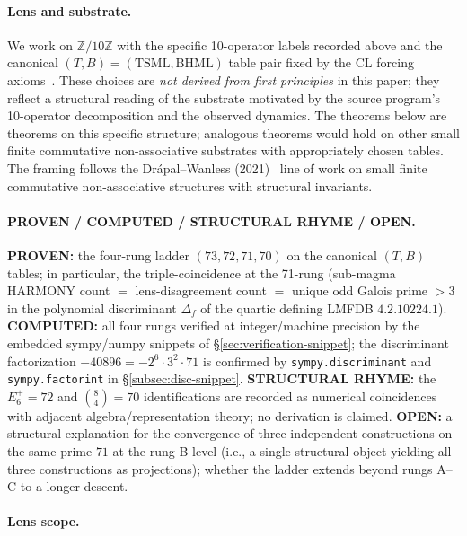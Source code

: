 \documentclass[11pt,reqno]{amsart}
\theoremstyle{definition}
\newcommand{\Z}{\mathbb{Z}}
\newcommand{\TSML}{\mathrm{TSML}}
\newcommand{\BHML}{\mathrm{BHML}}
\begin{document}
\paragraph{Lens and substrate.}
\label{sec:lens-subs}

We work on $\Z/10\Z$ with the specific 10-operator labels recorded
above and the canonical $(T, B) = (\TSML, \BHML)$ table pair fixed by
the CL forcing axioms~\cite{Sanders2026CLAxioms}. These choices are
\emph{not derived from first principles} in this paper; they reflect a
structural reading of the substrate motivated by the source program's
10-operator decomposition and the observed dynamics. The theorems
below are theorems on this specific structure; analogous theorems
would hold on other small finite commutative non-associative
substrates with appropriately chosen tables. The framing follows the
Drápal--Wanless (2021)~\cite{DrapalWanless2021a,DrapalWanless2021b} line of work on small
finite commutative non-associative structures with structural
invariants.

\paragraph{PROVEN / COMPUTED / STRUCTURAL RHYME / OPEN.}

\textbf{PROVEN:} the four-rung ladder $(73, 72, 71, 70)$ on the canonical
$(T, B)$ tables; in particular, the triple-coincidence at the
71-rung (sub-magma HARMONY count $=$ lens-disagreement count $=$ unique
odd Galois prime $>3$ in the polynomial discriminant $\Delta_f$ of the
quartic defining LMFDB $4.2.10224.1$). \textbf{COMPUTED:} all four rungs
verified at integer/machine precision by the embedded sympy/numpy
snippets of §\ref{sec:verification-snippet}; the discriminant
factorization $-40896 = -2^6 \cdot 3^2 \cdot 71$ is confirmed by
\texttt{sympy.discriminant} and \texttt{sympy.factorint} in
§\ref{subsec:disc-snippet}. \textbf{STRUCTURAL RHYME:} the
$E_6^+ = 72$ and $\binom{8}{4} = 70$ identifications are recorded as
numerical coincidences with adjacent algebra/representation theory;
no derivation is claimed. \textbf{OPEN:} a structural explanation for
the convergence of three independent constructions on the same prime
$71$ at the rung-B level (i.e., a single structural object yielding
all three constructions as projections); whether the ladder extends
beyond rungs A--C to a longer descent.

\paragraph{Lens scope.}
\end{document}
